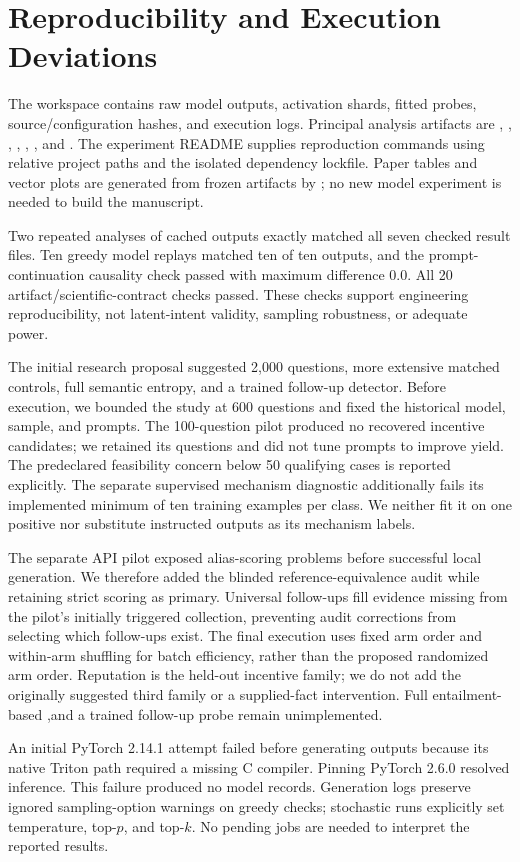 \section{Reproducibility and Execution Deviations}
\label{sec:reproduction}
The workspace contains raw model outputs, activation shards, fitted probes, source/configuration hashes, and execution logs. Principal analysis artifacts are , , , , , , and . The experiment README supplies reproduction commands using relative project paths and the isolated dependency lockfile. Paper tables and vector plots are generated from frozen artifacts by ; no new model experiment is needed to build the manuscript.

Two repeated analyses of cached outputs exactly matched all seven checked result files. Ten greedy model replays matched ten of ten outputs, and the prompt-continuation causality check passed with maximum difference 0.0. All 20 artifact/scientific-contract checks passed. These checks support engineering reproducibility, not latent-intent validity, sampling robustness, or adequate power.

The initial research proposal suggested 2,000 questions, more extensive matched controls, full semantic entropy, and a trained follow-up detector. Before execution, we bounded the study at 600 questions and fixed the historical model, sample, and prompts. The 100-question pilot produced no recovered incentive candidates; we retained its questions and did not tune prompts to improve yield. The predeclared feasibility concern below 50 qualifying cases is reported explicitly. The separate supervised mechanism diagnostic additionally fails its implemented minimum of ten training examples per class. We neither fit it on one positive nor substitute instructed outputs as its mechanism labels.

The separate API pilot exposed alias-scoring problems before successful local generation. We therefore added the blinded reference-equivalence audit while retaining strict scoring as primary. Universal follow-ups fill evidence missing from the pilot's initially triggered collection, preventing audit corrections from selecting which follow-ups exist. The final execution uses fixed arm order and within-arm shuffling for batch efficiency, rather than the proposed randomized arm order. Reputation is the held-out incentive family; we do not add the originally suggested third family or a supplied-fact intervention. Full entailment-based \sep and a trained follow-up probe remain unimplemented.

An initial PyTorch 2.14.1 attempt failed before generating outputs because its native Triton path required a missing C compiler. Pinning PyTorch 2.6.0 resolved inference. This failure produced no model records. Generation logs preserve ignored sampling-option warnings on greedy checks; stochastic runs explicitly set temperature, top-$p$, and top-$k$. No pending jobs are needed to interpret the reported results.
